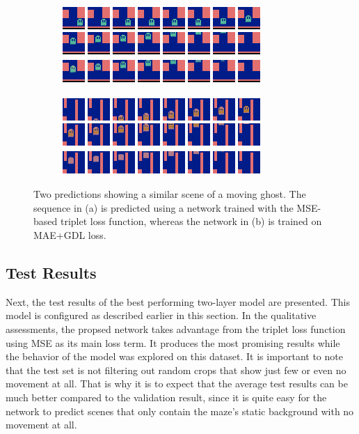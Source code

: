 \begin{figure}[h!tb]
\centering
\begin{subfigure}{0.49\textwidth}
  \centering
  \includegraphics[width=0.92\linewidth]{figures/pred/pac/blurry/pred-sharp.png}
  \caption{}
  \label{fig:pac-pred-sharp_sample}
\end{subfigure}%
\begin{subfigure}{0.49\textwidth}
  \centering
  \includegraphics[width=0.92\linewidth]{figures/pred/pac/blurry/pred-blurry.png}
  \caption{}
  \label{fig:pac-pred-blurry_sample}
\end{subfigure}
\caption[Generated MsPacman Patches using Different Loss Functions]{Two predictions showing a similar scene of a moving ghost. The sequence in (a) is predicted using a network trained with the MSE-based triplet loss function, whereas the network in (b) is trained on MAE+GDL loss.} \label{fig:pac-pred-blurry}
\end{figure}


\subsection{Test Results}

Next, the test results of the best performing two-layer model are presented. This model is configured as described earlier in this section. In the qualitative assessments, the propsed network takes advantage from the triplet loss function using MSE as its main loss term. It produces the most promising results while the behavior of the model was explored on this dataset. It is important to note that the test set is not filtering out random crops that show just few or even no movement at all. That is why it is to expect that the average test results can be much better compared to the validation result, since it is quite easy for the network to predict scenes that only contain the maze's static background with no movement at all.


